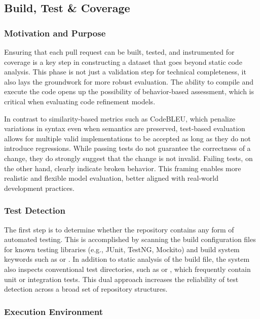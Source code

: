 \subsection{Build, Test \& Coverage}


\subsubsection{Motivation and Purpose}

Ensuring that each pull request can be built, tested, and instrumented for coverage is a key step in
constructing a dataset that goes beyond static code analysis. This phase is not just a validation
step for technical completeness, it also lays the groundwork for more robust evaluation. The ability
to compile and execute the code opens up the possibility of behavior-based assessment, which is
critical when evaluating code refinement models.

In contrast to similarity-based metrics such as CodeBLEU, which penalize variations in syntax even
when semantics are preserved, test-based evaluation allows for multiple valid implementations to be
accepted as long as they do not introduce regressions. While passing tests do not guarantee the
correctness of a change, they do strongly suggest that the change is not invalid. Failing tests, on
the other hand, clearly indicate broken behavior. This framing enables more realistic and flexible
model evaluation, better aligned with real-world development practices.

\subsubsection{Test Detection}

The first step is to determine whether the repository contains any form of automated
testing. This is accomplished by scanning the build configuration files for known testing libraries
(e.g., JUnit, TestNG, Mockito) and build system keywords such as  or
. In addition to static analysis of the build file, the system also
inspects conventional test directories, such as  or , which
frequently contain unit or integration tests. This dual approach increases the reliability of test
detection across a broad set of repository structures.

\subsubsection{Execution Environment}

